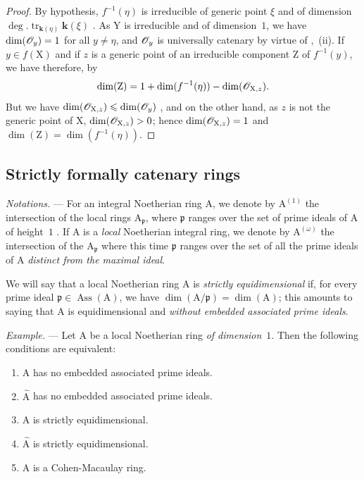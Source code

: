 \begin{proof}
By hypothesis, $f^{-1}(\eta)$ is irreducible of generic point $\xi$ and of dimension $\deg.\operatorname{tr}_{\boldsymbol{k}(\eta)}\boldsymbol{k}(\xi)$ .
As $\mathrm{Y}$ is irreducible and of dimension~$1$, we have $\dim(\mathscr{O}_y)=1$ for all $y\neq\eta$, and $\mathscr{O}_y$ is universally catenary by virtue of ,~(ii).
If $y\in f(\mathrm{X})$ and if $z$ is a generic point of an irreducible component $\mathrm{Z}$ of $f^{-1}(y)$, we have therefore, by 
\[
  \dim(\mathrm{Z})=1+\dim(f^{-1}(\eta))-\dim(\mathscr{O}_{\mathrm{X},z}).
\]
But we have $\dim(\mathscr{O}_{\mathrm{X},z})\leqslant\dim(\mathscr{O}_y)$ , and on the other hand, as $z$ is not the generic point of $\mathrm{X}$, $\dim(\mathscr{O}_{\mathrm{X},z})>0$; hence $\dim(\mathscr{O}_{\mathrm{X},z})=1$ and $\dim(\mathrm{Z})=\dim(f^{-1}(\eta))$.
\end{proof}


\newpage %
\subsection{Strictly formally catenary rings}
\label{subsection:IV.7.2}

\begin{env}[7.2.1]
\label{IV.7.2.1}
\emph{Notations.} ---
For an integral Noetherian ring $\mathrm{A}$, we denote by $\mathrm{A}^{(1)}$ the intersection of the local rings $\mathrm{A}_\mathfrak{p}$, where $\mathfrak{p}$ ranges over the set of prime ideals of $\mathrm{A}$ of height~$1$ .
If $\mathrm{A}$ is a \emph{local} Noetherian integral ring, we denote by $\mathrm{A}^{(\omega)}$ the intersection of the $\mathrm{A}_\mathfrak{p}$ where this time $\mathfrak{p}$ ranges over the set of all the prime ideals of $\mathrm{A}$ \emph{distinct from the maximal ideal}.

We will say that a local Noetherian ring $\mathrm{A}$ is \emph{strictly equidimensional} if, for every prime ideal $\mathfrak{p}\in\operatorname{Ass}(\mathrm{A})$, we have $\dim(\mathrm{A}/\mathfrak{p})=\dim(\mathrm{A})$; this amounts to saying that $\mathrm{A}$ is equidimensional and \emph{without embedded associated prime ideals}.
\end{env}

\begin{env}[7.2.1.1]
\label{IV.7.2.1.1}
\emph{Example.} ---
Let $\mathrm{A}$ be a local Noetherian ring \emph{of dimension}~$1$.
Then the following conditions are equivalent:
\begin{enumerate}[label=\emph{\alph*)}]
  \item $\mathrm{A}$ has no embedded associated prime ideals.
  \item[\emph{a$'$)}] $\widehat{\mathrm{A}}$ has no embedded associated prime ideals.
  \item $\mathrm{A}$ is strictly equidimensional.
  \item[\emph{b$'$)}] $\widehat{\mathrm{A}}$ is strictly equidimensional.
  \item $\mathrm{A}$ is a Cohen-Macaulay ring.
\end{enumerate}
\end{env}


